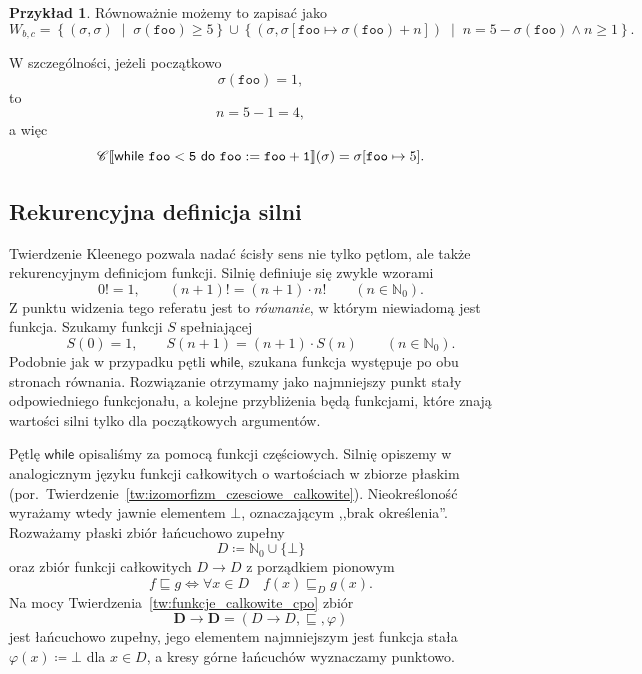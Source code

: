 \documentclass[11pt,a4paper]{article}
\theoremstyle{definition}
\newtheorem{przyklad}[definicja]{Przykład}
\theoremstyle{plain}
\newcommand{\bt}{\bot}                            %
\DeclarePairedDelimiter{\semdelim}{\llbracket}{\rrbracket}
\newcommand{\sem}[1]{\semdelim{#1}}
\newcommand{\Cc}{\mathscr{C}}   %
\newcommand{\kw}[1]{\ensuremath{\mathsf{#1}}} %
\begin{document}
\begin{przyklad}
	Równoważnie możemy to zapisać jako
	\[
		W_{b,c}
		=
		\left\{
		(\sigma,\sigma)
		\;\middle|\;
		\sigma(\mathtt{foo})\geq5
		\right\}
		\cup
		\left\{
		\left(
		\sigma,
		\sigma[\mathtt{foo}\mapsto\sigma(\mathtt{foo})+n]
		\right)
		\;\middle|\;
		n=5-\sigma(\mathtt{foo})
		\land
		n\geq1
		\right\}.
	\]
	
	W szczególności, jeżeli początkowo
	\[
	\sigma(\mathtt{foo})=1,
	\]
	to
	\[
	n=5-1=4,
	\]
	a więc
	\[
	\Cc\sem{\kw{while}\ \mathtt{foo}<\mathtt{5}\ \kw{do}\
		\mathtt{foo}:=\mathtt{foo}+\mathtt{1}}(\sigma)
	=
	\sigma[\mathtt{foo}\mapsto5].
	\]
\end{przyklad}

\subsection{Rekurencyjna definicja silni}

Twierdzenie Kleenego pozwala nadać ścisły sens nie tylko pętlom, ale
także rekurencyjnym definicjom funkcji. Silnię definiuje się zwykle
wzorami
\[
0!=1,
\qquad
(n+1)!=(n+1)\cdot n!
\qquad(n\in\mathbb N_0).
\]
Z punktu widzenia tego referatu jest to \emph{równanie}, w którym
niewiadomą jest funkcja. Szukamy funkcji $S$ spełniającej
\[
S(0)=1,
\qquad
S(n+1)=(n+1)\cdot S(n)
\qquad(n\in\mathbb N_0).
\]
Podobnie jak w przypadku pętli \kw{while}, szukana funkcja występuje po
obu stronach równania. Rozwiązanie otrzymamy jako najmniejszy punkt stały
odpowiedniego funkcjonału, a kolejne przybliżenia będą funkcjami, które
znają wartości silni tylko dla początkowych argumentów.

Pętlę \kw{while} opisaliśmy za pomocą funkcji częściowych. Silnię
opiszemy w analogicznym języku funkcji całkowitych o wartościach w zbiorze
płaskim (por.\ Twierdzenie~\ref{tw:izomorfizm_czesciowe_calkowite}).
Nieokreśloność wyrażamy wtedy jawnie elementem $\bt$, oznaczającym
,,brak określenia''. Rozważamy płaski zbiór łańcuchowo zupełny
\[
D\coloneqq\mathbb N_0\cup\{\bt\}
\]
oraz zbiór funkcji całkowitych $D\to D$ z porządkiem pionowym
\[
f\sqsubseteq g
\iff
\forall x\in D\quad
f(x)\sqsubseteq_D g(x).
\]
Na mocy Twierdzenia~\ref{tw:funkcje_calkowite_cpo} zbiór
\[
\boldsymbol{D\to D}
=
(D\to D,\sqsubseteq,\varphi)
\]
jest łańcuchowo zupełny, jego elementem najmniejszym jest funkcja stała
$\varphi(x)\coloneqq\bt$ dla $x\in D$, a kresy górne łańcuchów wyznaczamy punktowo.
\end{document}
